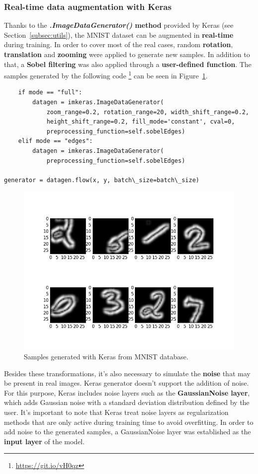 \subsubsection{Real-time data augmentation with Keras}
Thanks to the \textbf{\textit{.ImageDataGenerator()} method} provided by Keras (see Section~\ref{subsec:utils}), the MNIST dataset can be augmented in \textbf{real-time} during training. In order to cover most of the real cases, random \textbf{rotation}, \textbf{translation} and \textbf{zooming} were applied to generate new samples. In addition to that, a \textbf{Sobel filtering} was also applied through a \textbf{user-defined function}. The samples generated by the following code \footnote{\url{https://git.io/vH0qz}} can be seen in Figure~\ref{fig:aug_keras}.
\begin{lstlisting}
	if mode == "full":
		datagen = imkeras.ImageDataGenerator(
			zoom_range=0.2, rotation_range=20, width_shift_range=0.2, 
			height_shift_range=0.2, fill_mode='constant', cval=0,
			preprocessing_function=self.sobelEdges)
	elif mode == "edges":
		datagen = imkeras.ImageDataGenerator(
			preprocessing_function=self.sobelEdges)

generator = datagen.flow(x, y, batch\_size=batch\_size)
\end{lstlisting}

\begin{figure}
	\centering
	\includegraphics[width=12cm, keepaspectratio]{figures/aug_keras.png}
	\caption{Samples generated with Keras from MNIST database.}
	\label{fig:aug_keras}
\end{figure}

Besides these transformations, it's also necessary to simulate the \textbf{noise} that may be present in real images. Keras generator doesn't support the addition of noise. For this purpose, Keras includes noise layers such as the \textbf{GaussianNoise layer}, which adds Gaussian noise with a standard deviation distribution defined by the user. It's important to note that Keras treat noise layers as regularization methods that are only active during training time to avoid overfitting. In order to add noise to the generated samples, a GaussianNoise layer was established as the \textbf{input layer} of the model.

